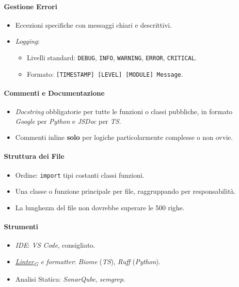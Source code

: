 \documentclass[12pt, a4paper]{article}
\newcommand{\urlglossario}{https://skynetunigroup.github.io/Code_Guardian/Documentazione/PB/glossario_v2.0.0.pdf} %
\newcommand{\glo}[2]{\href{\urlglossario\#nameddest=#2}{#1\textsubscript{G}}}
\begin{document}
\newpage
\paragraph{Gestione Errori}
\begin{itemize}
    \item Eccezioni specifiche con messaggi chiari e descrittivi.
    \item \textit{Logging}: 
    \begin{itemize}
        \item Livelli standard: \texttt{DEBUG}, \texttt{INFO}, \texttt{WARNING}, \texttt{ERROR}, \texttt{CRITICAL}.
        \item Formato: \texttt{[TIMESTAMP] [LEVEL] [MODULE] Message}.
    \end{itemize}
\end{itemize}

\paragraph{Commenti e Documentazione}
\begin{itemize}
    \item \textit{Docstring} obbligatorie per tutte le funzioni o classi pubbliche, in formato \textit{Google} per \textit{Python} e \textit{JSDoc} per \textit{TS}.
    \item Commenti inline \textbf{solo} per logiche particolarmente complesse o non ovvie.
\end{itemize}

\paragraph{Struttura dei File}
\begin{itemize}
    \item Ordine: \texttt{import} \textrightarrow tipi \textrightarrow costanti \textrightarrow classi \textrightarrow funzioni.
    \item Una classe o funzione principale per file, raggruppando per responsabilità.
    \item La lunghezza del file non dovrebbe superare le 500 righe.
\end{itemize}

\paragraph{Strumenti}
\begin{itemize}
    \item \textit{IDE}: \textit{VS Code}, consigliato.
    \item \textit{\glo{Linter}{linter} e formatter}: \textit{Biome} (\textit{TS}), \textit{Ruff} (\textit{Python}).
    \item Analisi Statica: \textit{SonarQube}, \textit{semgrep}.
\end{itemize}
\end{document}
